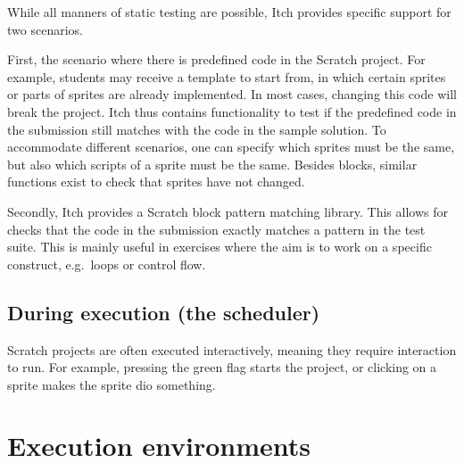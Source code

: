 \documentclass[main]{subfiles}
\begin{document}
While all manners of static testing are possible, Itch provides specific support for two scenarios.

First, the scenario where there is predefined code in the Scratch project.
For example, students may receive a template to start from, in which certain sprites or parts of sprites are already implemented.
In most cases, changing this code will break the project.
Itch thus contains functionality to test if the predefined code in the submission still matches with the code in the sample solution.
To accommodate different scenarios, one can specify which sprites must be the same, but also which scripts of a sprite must be the same.
Besides blocks, similar functions exist to check that sprites have not changed.

Secondly, Itch provides a Scratch block pattern matching library.
This allows for checks that the code in the submission exactly matches a pattern in the test suite.
This is mainly useful in exercises where the aim is to work on a specific construct, e.g.\ loops or control flow.

\subsection{During execution (the scheduler)}\label{subsec:during-execution-(the-scheduler)}

Scratch projects are often executed interactively, meaning they require interaction to run.
For example, pressing the green flag starts the project, or clicking on a sprite makes the sprite dio something.






\section{Execution environments}\label{sec:execution-environments}
\end{document}
